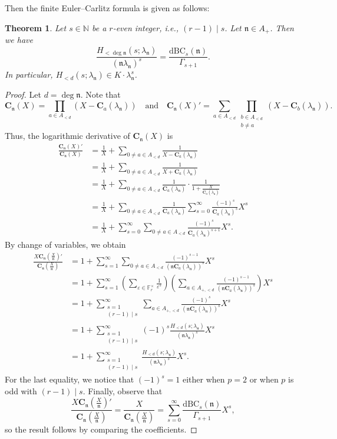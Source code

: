 \documentclass[12pt,reqno]{amsart}
\numberwithin{equation}{section}
\theoremstyle{plain}
\newtheorem{thm}{Theorem}[section]
\theoremstyle{definition}
\theoremstyle{remark}
\newcommand{\NN}{\mathbb{N}}
\newcommand{\FF}{\mathbb{F}}
\newcommand{\nfk}{\mathfrak{n}}
\newcommand{\C}{\mathbf{C}}
\newcommand{\dBC}{\mathrm{dBC}}
\begin{document}
Then the finite Euler--Carlitz formula is given as follows:
\begin{thm}\label{thm:finite Euler Carlitz}
    Let $s\in\NN$ be a $r$-even integer, i.e., $(r-1)\mid s$. Let $\nfk\in A_+$. Then we have
    \[
        \frac{H_{<\deg\nfk}(s;\lambda_\nfk)}{(\nfk\lambda_\nfk)^s}=\frac{\dBC_s(\nfk)}{\Gamma_{s+1}}.
    \]
    In particular, $H_{<d}(s;\lambda_\nfk)\in K\cdot \lambda_\nfk^s$.
\end{thm}
\begin{proof}
    Let $d=\deg\nfk$. Note that
    $$\C_{\nfk}(X)=\prod_{a\in A_{<d}}\left(X-\C_a(\lambda_\nfk)\right)\quad\text{and}\quad\C_\nfk(X)'=\sum_{a\in A_{<d}}\prod_{\substack{b\in A_{<d}\\ b\neq a}}\left(X-\C_b(\lambda_\nfk)\right).$$
    Thus, the logarithmic derivative of $\C_\nfk(X)$ is
\begin{align*}
\frac{\C_\nfk(X)'}{\C_\nfk(X)}
&= \frac{1}{X}
  + \sum_{0\neq a\in A_{<d}}
    \frac{1}{X-\C_a(\lambda_\nfk)}
\\
&= \frac{1}{X}
  + \sum_{0\neq a\in A_{<d}}
    \frac{1}{X+\C_a(\lambda_\nfk)}
\\
&= \frac{1}{X}
  + \sum_{0\neq a\in A_{<d}}
    \frac{1}{\C_a(\lambda_\nfk)}
    \cdot
    \frac{1}{\displaystyle 1+\frac{X}{\C_a(\lambda_\nfk)}}
\\
&= \frac{1}{X}
    +\sum_{0\neq a\in A_{<d}}
    \frac{1}{\C_a(\lambda_\nfk)}\sum_{s=0}^\infty \frac{(-1)^s}{\C_a(\lambda_\nfk)^s}X^s
\\
&= \frac{1}{X}
    +\sum_{s=0}^\infty \sum_{0\neq a\in A_{<d}}
    \frac{(-1)^s}{\C_a(\lambda_\nfk)^{s+1}}X^s.
\end{align*}
By change of variables, we obtain
\begin{align*}
\frac{X\C_\nfk(\frac{X}{\nfk})'}{\C_\nfk\left(\frac{X}{\nfk}\right)}
&= 1
    +\sum_{s=1}^\infty \sum_{0\neq a\in A_{<d}}\frac{(-1)^{s-1}}{\left(\nfk\C_a(\lambda_\nfk)\right)^s}X^s
\\
&= 1
    +\sum_{s=1}^\infty \left(\sum_{\varepsilon\in\FF_r^\times}\frac{1}{\varepsilon^s}\right)\left(\sum_{ a\in A_{+,<d}}\frac{(-1)^{s-1}}{\left(\nfk\C_a(\lambda_\nfk)\right)^s}\right)X^s\\
&= 1
    +\sum_{\substack{s=1\\(r-1)\mid s}}^\infty \sum_{a\in A_{+,<d}}\frac{(-1)^{s}}{\left(\nfk\C_a(\lambda_\nfk)\right)^s}X^s
\\
&= 1
    +\sum_{\substack{s=1\\(r-1)\mid s}}^\infty (-1)^s \frac{H_{<d}(s;\lambda_\nfk)}{(\nfk\lambda_\nfk)^s} X^s
\\
&= 1
    +\sum_{\substack{s=1\\(r-1)\mid s}}^\infty \frac{H_{<d}(s;\lambda_\nfk)}{(\nfk\lambda_\nfk)^s} X^s.
\end{align*}
For the last equality, we notice that  $(-1)^s=1$ either when $p=2$ or when $p$ is odd with $(r-1)\mid s$. Finally, observe that
$$\frac{X\C_\nfk(\frac{X}{\nfk})'}{\C_\nfk\left(\frac{X}{\nfk}\right)}=\frac{X}{\C_\nfk\left(\frac{X}{\nfk}\right)}=\sum_{s=0}^\infty \frac{\dBC_s(\nfk)}{\Gamma_{s+1}}X^s,$$ so the result follows by comparing the coefficients.
\end{proof}
\end{document}
